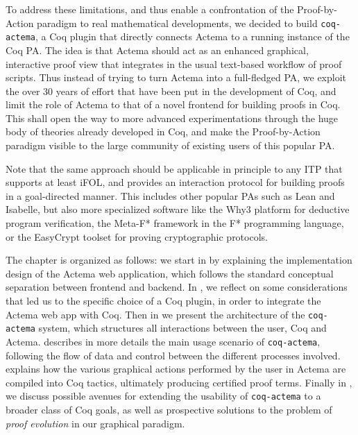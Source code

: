 To address these limitations, and thus enable a confrontation of the
Proof-by-Action paradigm to real mathematical developments, we decided to build
\texttt{coq-actema}, a Coq plugin that directly connects Actema to a running
instance of the Coq PA. The idea is that Actema should act as an enhanced
graphical, interactive proof view that integrates in the usual text-based
workflow of proof scripts. Thus instead of trying to turn Actema into a
full-fledged PA, we exploit the over 30 years of effort that have been put in
the development of Coq, and limit the role of Actema to that of a novel frontend
for building proofs in Coq. This shall open the way to more advanced
experimentations through the huge body of theories already developed in Coq, and
make the Proof-by-Action paradigm visible to the large community of existing
users of this popular PA.

Note that the same approach should be applicable in principle to any ITP that
supports at least iFOL, and provides an interaction protocol for building proofs
in a goal-directed manner. This includes other popular PAs such as Lean and
Isabelle, but also more specialized software like the Why3 platform for
deductive program verification, the Meta-F* framework in the F* programming
language, or the EasyCrypt toolset for proving cryptographic protocols.


The chapter is organized as follows: we start in  by explaining
the implementation design of the Actema web application, which follows the
standard conceptual separation between frontend and backend. In
, we reflect on some considerations that led us to the
specific choice of a Coq plugin, in order to integrate the Actema web app with
Coq. Then in  we present the architecture of the
\texttt{coq-actema} system, which structures all interactions between the user,
Coq and Actema.  describes in more details the main usage
scenario of \texttt{coq-actema}, following the flow of data and control between
the different processes involved.  explains how the various
graphical actions performed by the user in Actema are compiled into Coq tactics,
ultimately producing certified proof terms. Finally in , we
discuss possible avenues for extending the usability of \texttt{coq-actema} to a
broader class of Coq goals, as well as prospective solutions to the problem of
\emph{proof evolution} in our graphical paradigm.


